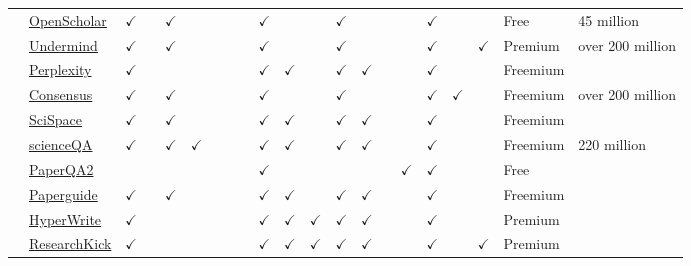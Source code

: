 \begin{table}[h!]
{\begin{tabular}{lllll|llll|lllll|lllll|ll}
& \href{https://openscholar.allen.ai}{OpenScholar} & $\checkmark$ &  & $\checkmark$ &  &  &  &  & $\checkmark$ &  &  & $\checkmark$ &  &  &  & $\checkmark$ &  &  & Free & 45 million \\ 
 & \href{https://www.undermind.ai/}{Undermind} & $\checkmark$ &  & $\checkmark$ &  &  &  &  & $\checkmark$ &  &  & $\checkmark$ &  &  &  & $\checkmark$ &  & $\checkmark$ & Premium & over 200 million \\ 
 & \href{https://www.perplexity.ai/}{Perplexity} & $\checkmark$ &  &  &  &  &  &  & $\checkmark$ & $\checkmark$ &  & $\checkmark$ & $\checkmark$ &  &  & $\checkmark$ &  &  & Freemium &  \\ 
 & \href{https://consensus.app}{Consensus} & $\checkmark$ &  & $\checkmark$ &  &  &  &  & $\checkmark$ &  &  & $\checkmark$ &  &  &  & $\checkmark$ & $\checkmark$ &  & Freemium & over 200 million \\ 
 & \href{https://typeset.io}{SciSpace} & $\checkmark$ &  & $\checkmark$ &  &  &  &  & $\checkmark$ & $\checkmark$ &  & $\checkmark$ & $\checkmark$ &  &  & $\checkmark$ &  &  & Freemium &  \\ 
 & \href{https://www.scienceos.ai/}{scienceQA} & $\checkmark$ &  & $\checkmark$ & $\checkmark$ &  &  &  & $\checkmark$ & $\checkmark$ &  & $\checkmark$ & $\checkmark$ &  &  & $\checkmark$ &  &  & Freemium & 220 million \\ 
 & \href{https://github.com/Future-House/paper-qa}{PaperQA2} &  &  &  &  &  &  &  & $\checkmark$ &  &  &  &  &  & $\checkmark$ & $\checkmark$ &  &  & Free &  \\ 
 & \href{https://paperguide.ai/}{Paperguide} & $\checkmark$ &  & $\checkmark$ &  &  &  &  & $\checkmark$ & $\checkmark$ &  & $\checkmark$ & $\checkmark$ &  &  & $\checkmark$ &  &  & Freemium &  \\ 
 & \href{https://www.hyperwriteai.com/}{HyperWrite} & $\checkmark$ &  &  &  &  &  &  & $\checkmark$ & $\checkmark$ & $\checkmark$ & $\checkmark$ & $\checkmark$ &  &  & $\checkmark$ &  &  & Premium &  \\ 
 & \href{https://www.researchkick.com/chat}{ResearchKick} & $\checkmark$ &  &  &  &  &  &  & $\checkmark$ & $\checkmark$ & $\checkmark$ & $\checkmark$ & $\checkmark$ &  &  & $\checkmark$ &  & $\checkmark$ & Premium &  \\ \midrule

\end{tabular}}
\end{table}
